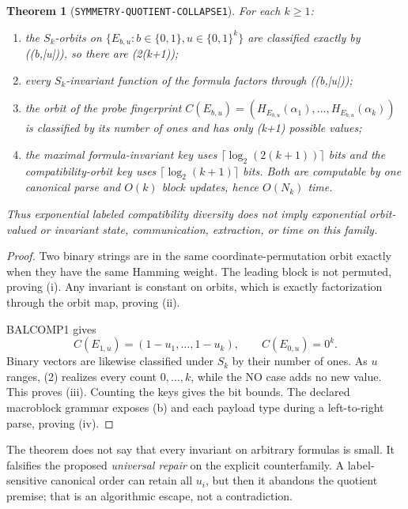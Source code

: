 \documentclass[11pt]{article}
\newtheorem{theorem}{Theorem}
\begin{document}
\begin{theorem}[\texttt{SYMMETRY-QUOTIENT-COLLAPSE1}]
For each \(k\ge1\):
\begin{enumerate}[label=(\roman*)]
\item the \(S_k\)-orbits on \(\{E_{b,u}:b\in\{0,1\},u\in\{0,1\}^k\}\) are
classified exactly by ((b,|u|)), so there are (2(k+1));
\item every \(S_k\)-invariant function of the formula factors through
((b,|u|));
\item the orbit of the probe fingerprint
\(C(E_{b,u})=(H_{E_{b,u}}(\alpha_1),\ldots,H_{E_{b,u}}(\alpha_k))\)
is classified by its number of ones and has only (k+1) possible values;
\item the maximal formula-invariant key uses
\(\lceil\log_2(2(k+1))\rceil\) bits and the compatibility-orbit key uses
\(\lceil\log_2(k+1)\rceil\) bits.  Both are computable by one canonical parse
and \(O(k)\) block updates, hence \(O(N_k)\) time.
\end{enumerate}
Thus exponential labeled compatibility diversity does not imply exponential
orbit-valued or invariant state, communication, extraction, or time on this
family.
\end{theorem}

\begin{proof}
Two binary strings are in the same coordinate-permutation orbit exactly when
they have the same Hamming weight.  The leading block is not permuted, proving
(i).  Any invariant is constant on orbits, which is exactly factorization
through the orbit map, proving (ii).

BALCOMP1 gives
\[
 C(E_{1,u})=(1-u_1,\ldots,1-u_k),\qquad C(E_{0,u})=0^k.       \tag{2}
\]
Binary vectors are likewise classified under \(S_k\) by their number of
ones.  As \(u\) ranges, (2) realizes every count \(0,\ldots,k\), while the NO
case adds no new value.  This proves (iii).  Counting the keys gives the bit
bounds.  The declared macroblock grammar exposes (b) and each payload type
during a left-to-right parse, proving (iv).
\end{proof}

The theorem does not say that every invariant on arbitrary formulas is small.
It falsifies the proposed \emph{universal repair} on the explicit counterfamily.
A label-sensitive canonical order can retain all \(u_i\), but then it abandons
the quotient premise; that is an algorithmic escape, not a contradiction.
\end{document}
